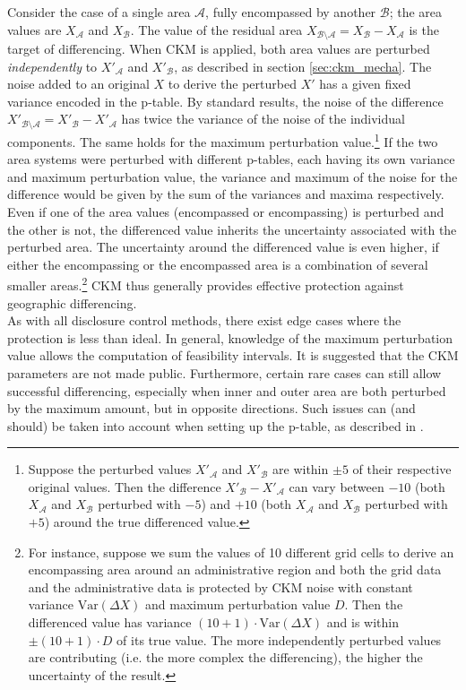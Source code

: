 Consider the case of a single area $\mathcal{A}$, fully encompassed by another $\mathcal{B}$; the area values are $X_{\mathcal{A}}$ and $X_{\mathcal{B}}$. The value of the residual area $X_{\mathcal{B}\setminus\mathcal{A}} = X_{\mathcal{B}} - X_{\mathcal{A}}$ is the target of differencing. When CKM is applied, both area values are perturbed \emph{independently} to $X'_{\mathcal{A}}$ and $X'_{\mathcal{B}}$, as described in section \ref{sec:ckm_mecha}. The noise added to an original $X$ to derive  the perturbed $X'$ has a given fixed variance encoded in the p-table.
By standard results, the noise of the difference $X'_{\mathcal{B}\setminus{\mathcal{A}}} = X'_{\mathcal{B}} - X'_{\mathcal{A}}$ has twice the variance of the noise of the individual components.
The same holds for the maximum perturbation value.\footnote{
    Suppose the perturbed values $X'_{\mathcal{A}}$ and $X'_{\mathcal{B}}$ are within $\pm 5$ of their respective original values. Then the difference $X'_{\mathcal{B}} - X'_{\mathcal{A}}$ can vary between $-10$ (both $X_{\mathcal{A}}$ and $X_{\mathcal{B}}$ perturbed with $-5$) and $+10$ (both $X_{\mathcal{A}}$ and $X_{\mathcal{B}}$ perturbed with $+5$) around the true differenced value.}
If the two area systems were perturbed with different p-tables, each having its own variance and maximum perturbation value, the variance and maximum of the noise for the difference would be given by the sum of the variances and maxima respectively. Even if one of the area values (encompassed or encompassing) is perturbed and the other is not, the differenced value inherits the uncertainty associated with the perturbed area. 
The uncertainty around the differenced value is even higher, if either the encompassing or the encompassed area is a combination of several smaller areas.\footnote{
    For instance, suppose we sum the values of 10 different grid cells to derive an encompassing area around an administrative region and both the grid data and the administrative data is protected by CKM noise with constant variance $\mathrm{Var}(\Delta X)$ and maximum perturbation value $D$. Then the differenced value has variance $(10 + 1) \cdot \mathrm{Var}(\Delta X)$ and is within $\pm (10 + 1) \cdot D$ of its true value. The more independently perturbed values are contributing (i.e. the more complex the differencing), the higher the uncertainty of the result.}
CKM thus generally provides effective protection against geographic differencing.\\

As with all disclosure control methods, there exist edge cases where the protection is less than ideal. In general, knowledge of the maximum perturbation value allows the computation of feasibility intervals. It is suggested that the CKM parameters are not made public. Furthermore, certain rare cases can still allow successful differencing, especially when inner and outer area are both perturbed by the maximum amount, but in opposite directions. Such issues can (and should) be taken into account when setting up the p-table, as described in \cite{EnderleEtAl2020}.\\

